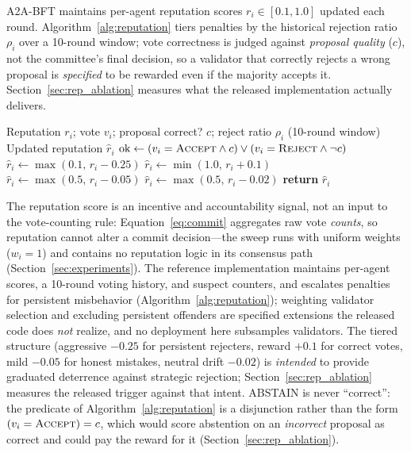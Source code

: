 \documentclass{article}
\begin{document}
A2A-BFT maintains per-agent reputation scores $r_i \in [0.1, 1.0]$ updated each round. Algorithm~\ref{alg:reputation} tiers penalties by the historical rejection ratio $\rho_i$ over a 10-round window; vote correctness is judged against \emph{proposal quality} ($c$), not the committee's final decision, so a validator that correctly rejects a wrong proposal is \emph{specified} to be rewarded even if the majority accepts it. Section~\ref{sec:rep_ablation} measures what the released implementation actually delivers.

\begin{algorithm}[t]
\caption{Reputation Update with Tiered Penalties}
\label{alg:reputation}
\begin{algorithmic}[1]
\Require Reputation $r_i$; vote $v_i$; proposal correct? $c$; reject ratio $\rho_i$ (10-round window)
\Ensure Updated reputation $\hat{r}_i$
\State $\text{ok} \gets (v_i = \textsc{Accept} \wedge c) \vee (v_i = \textsc{Reject} \wedge \neg c)$ 
 
    \State $\hat{r}_i \gets \max(0.1,\, r_i - 0.25)$
 
    \State $\hat{r}_i \gets \min(1.0,\, r_i + 0.1)$
 
    \State $\hat{r}_i \gets \max(0.5,\, r_i - 0.05)$
\Else {}
    \State $\hat{r}_i \gets \max(0.5,\, r_i - 0.02)$
\EndIf
\State \textbf{return} $\hat{r}_i$
\end{algorithmic}
\end{algorithm}

The reputation score is an incentive and accountability signal, not an input to the vote-counting rule: Equation~\ref{eq:commit} aggregates raw vote \emph{counts}, so reputation cannot alter a commit decision---the sweep runs with uniform weights ($w_i{=}1$) and contains no reputation logic in its consensus path (Section~\ref{sec:experiments}). The reference implementation maintains per-agent scores, a 10-round voting history, and suspect counters, and escalates penalties for persistent misbehavior (Algorithm~\ref{alg:reputation}); weighting validator selection and excluding persistent offenders are specified extensions the released code does \emph{not} realize, and no deployment here subsamples validators. The tiered structure (aggressive $-0.25$ for persistent rejecters, reward $+0.1$ for correct votes, mild $-0.05$ for honest mistakes, neutral drift $-0.02$) is \emph{intended} to provide graduated deterrence against strategic rejection; Section~\ref{sec:rep_ablation} measures the released trigger against that intent. ABSTAIN is never ``correct'': the predicate of Algorithm~\ref{alg:reputation} is a disjunction rather than the form $(v_i = \textsc{Accept}) = c$, which would score abstention on an \emph{incorrect} proposal as correct and could pay the reward for it (Section~\ref{sec:rep_ablation}).
\end{document}
